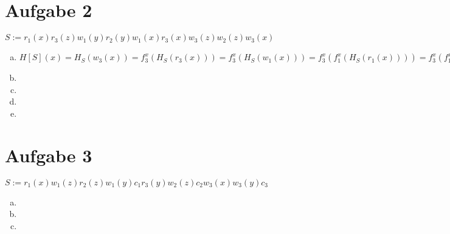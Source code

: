 \documentclass{scrartcl}
\begin{document}
\section*{Aufgabe 2}

$S := r_1(x)r_3(z)w_1(y)r_2(y)w_1(x)r_3(x)w_3(z)w_2(z)w_3(x)$
\begin{enumerate}[a)]
\item
$H[S](x) =  H_S(w_3(x)) = f^x_3(H_S(r_3(x))) = f^x_3(H_S(w_1(x))) = f^x_3(f^x_1(H_S(r_1(x)))) = f^x_3(f^x_1(f^x_0()))$

\item

\item

\item

\item

\end{enumerate}

\section*{Aufgabe 3}

$S := r_1(x)w_1(z)r_2(z)w_1(y)c_1r_3(y)w_2(z)c_2w_3(x)w_3(y)c_3$
\begin{enumerate}[a)]
\item

\item

\item

\end{enumerate}
\end{document}
